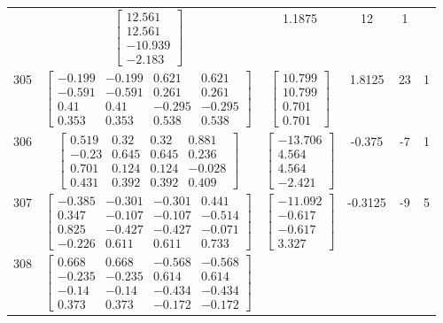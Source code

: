 \documentclass[a4paper,12pt]{article}
\begin{document}
\begin{tabular}{c c c c c c}
&
$\begin{bmatrix} 12.561 \\ 12.561 \\ -10.939 \\ -2.183 \end{bmatrix}$
&
1.1875
&
12
&
1
\\
305
&
$\begin{bmatrix} -0.199 & -0.199 & 0.621 & 0.621 \\ -0.591 & -0.591 & 0.261 & 0.261 \\ 0.41 & 0.41 & -0.295 & -0.295 \\ 0.353 & 0.353 & 0.538 & 0.538 \end{bmatrix}$
&
$\begin{bmatrix} 10.799 \\ 10.799 \\ 0.701 \\ 0.701 \end{bmatrix}$
&
1.8125
&
23
&
1
\\
306
&
$\begin{bmatrix} 0.519 & 0.32 & 0.32 & 0.881 \\ -0.23 & 0.645 & 0.645 & 0.236 \\ 0.701 & 0.124 & 0.124 & -0.028 \\ 0.431 & 0.392 & 0.392 & 0.409 \end{bmatrix}$
&
$\begin{bmatrix} -13.706 \\ 4.564 \\ 4.564 \\ -2.421 \end{bmatrix}$
&
-0.375
&
-7
&
1
\\
307
&
$\begin{bmatrix} -0.385 & -0.301 & -0.301 & 0.441 \\ 0.347 & -0.107 & -0.107 & -0.514 \\ 0.825 & -0.427 & -0.427 & -0.071 \\ -0.226 & 0.611 & 0.611 & 0.733 \end{bmatrix}$
&
$\begin{bmatrix} -11.092 \\ -0.617 \\ -0.617 \\ 3.327 \end{bmatrix}$
&
-0.3125
&
-9
&
5
\\
308
&
$\begin{bmatrix} 0.668 & 0.668 & -0.568 & -0.568 \\ -0.235 & -0.235 & 0.614 & 0.614 \\ -0.14 & -0.14 & -0.434 & -0.434 \\ 0.373 & 0.373 & -0.172 & -0.172 \end{bmatrix}$

\end{tabular}
\end{document}
